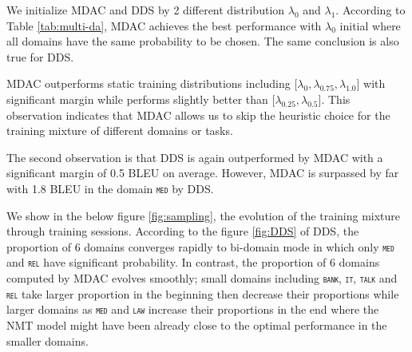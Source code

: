 \documentclass[11pt]{article}
\newcommand{\domain}[1]{\texttt{\textsc{#1}}}
\begin{document}
We initialize MDAC and DDS by 2 different distribution $\lambda_0$ and $\lambda_1$. According to Table \ref{tab:multi-da}, MDAC achieves the best performance with $\lambda_0$ initial where all domains have the same probability to be chosen. The same conclusion is also true for DDS.

MDAC outperforms static training distributions including $\big[ \lambda_0, \lambda_{0.75}, \lambda_{1.0}\big]$ with significant margin while performs slightly better than $\big[ \lambda_{0.25}, \lambda_{0.5} \big]$. This observation indicates that MDAC allows us to skip the heuristic choice for the training mixture of different domains or tasks.

The second observation is that DDS is again outperformed by MDAC with a significant margin of 0.5 BLEU on average. However, MDAC is surpassed by far with 1.8 BLEU in the domain \domain{med} by DDS. 

We show in the below figure \ref{fig:sampling}, the evolution of the training mixture through training sessions. According to the figure \ref{fig:DDS} of DDS, the proportion of 6 domains converges rapidly to bi-domain mode in which only \domain{med} and \domain{rel} have significant probability. In contrast, the proportion of 6 domains computed by MDAC evolves smoothly; small domains including \domain{bank}, \domain{it}, \domain{talk} and \domain{rel} take larger proportion in the beginning then decrease their proportions while larger domains as \domain{med} and \domain{law} increase their proportions in the end where the NMT model might have been already close to the optimal performance in the smaller domains.
\end{document}

